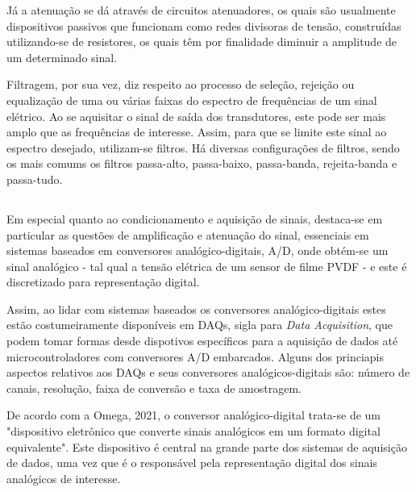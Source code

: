 \documentclass[
	12pt,				
	oneside,			
	a4paper,			
	english,			
	brazil,			
	]{abntex2ppgsi}
\begin{document}
Já a atenuação se dá através de circuitos atenuadores, os quais são usualmente dispositivos passivos que funcionam como redes divisoras de tensão, construídas utilizando-se de resistores, os quais têm por finalidade diminuir a amplitude de um determinado sinal.


Filtragem, por sua vez, diz respeito ao processo de seleção, rejeição ou equalização de uma ou várias faixas do espectro de frequências de um sinal elétrico. Ao se aquisitar o sinal de saída dos transdutores, este pode ser mais amplo que as frequências de interesse. Assim, para que se limite este sinal ao espectro desejado, utilizam-se filtros. Há diversas configurações de filtros, sendo os mais comums os filtros passa-alto, passa-baixo, passa-banda, rejeita-banda e passa-tudo. 


\subsection{}


Em especial quanto ao condicionamento e aquisição de sinais, destaca-se em particular as questões de amplificação e atenuação do sinal, essenciais em sistemas baseados em conversores analógico-digitais, A/D, onde obtém-se um sinal analógico - tal qual a tensão elétrica de um sensor de filme PVDF - e este é discretizado para representação digital. 

Assim, ao lidar com sistemas baseados os conversores analógico-digitais estes estão costumeiramente disponíveis em DAQs, sigla para \textit{Data Acquisition}, que podem tomar formas desde dispotivos específicos para a aquisição de dados até microcontroladores com conversores A/D embarcados. Alguns dos princiapis aspectos relativos aos DAQs e seus conversores analógicos-digitais são: número de canais, resolução, faixa de conversão e taxa de amostragem.

De acordo com a Omega, 2021, o conversor analógico-digital trata-se de um "dispositivo eletrônico que converte sinais analógicos em um formato digital equivalente". Este dispositivo é central na grande parte dos sistemas de aquisição de dados, uma vez que é o responsável pela representação digital dos sinais analógicos de interesse. 

\end{document}
